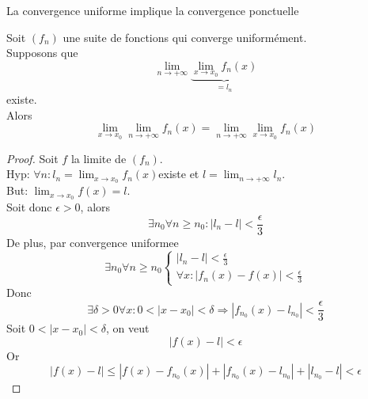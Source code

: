 \documentclass[../main.tex]{subfiles}
\begin{document}
\begin{rmq}
La convergence uniforme implique la convergence ponctuelle
\end{rmq}
\begin{propo}
	Soit $( f_n) $ une suite de fonctions qui converge uniformément.\\
	Supposons que 
	\[ 
		\lim_{n \to  + \infty} \underbrace{\lim_{x \to x_0} f_n( x)}_{=l_n} 
	\]
	existe.\\
	Alors
	\[ 
		\lim_{x \to x_0} \lim_{n \to  + \infty} f_n( x) = \lim_{n \to  + \infty} \lim_{x \to x_0} f_n( x) 
	\]
	
\end{propo}
\begin{proof}
	Soit $f$ la limite de $( f_n) $.\\
	Hyp: $\forall n: l_n = \lim_{x \to x_0} f_n( x) $existe et
	$l = \lim_{n \to  + \infty} l_n$.\\
	But: $\lim_{x \to x_0} f( x) =l$.\\
	Soit donc $\epsilon > 0$, alors
	\[ 
	\exists n_0\forall n\geq n_0: |l_n-l|< \frac{\epsilon}{3}
	\]
	De plus, par convergence uniformee
	\[ 
	\exists n_0\forall n \geq n_0
	\begin{cases}
	|l_n-l|< \frac{\epsilon}{3}\\
	\forall x: |f_n( x) -f( x) |< \frac{\epsilon}{3}
	\end{cases}
	\]
	Donc
	\[ 
		\exists \delta> 0 \forall x: 0< |x-x_0| < \delta \Rightarrow |f_{n_0} ( x) - l_{n_0} | < \frac{\epsilon}{3}
	\]
Soit $0< |x-x_0|< \delta$, on veut
\[ 
	|f( x) -l| <\epsilon
\]
Or
\[ 
	|f( x) -l| \leq |f( x) -f_{n_0} ( x) | + |f_{n_0} ( x) -l_{n_0} | + |l_{n_0} -l|< \epsilon
\]

	
\end{proof}
\end{document}
